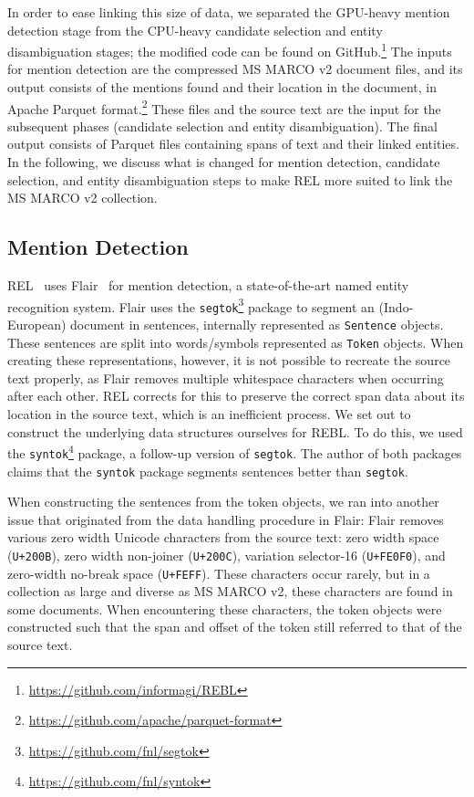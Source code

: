 In order to ease linking this size of data, we separated the GPU-heavy mention detection stage from the CPU-heavy candidate selection and entity disambiguation stages; the modified code can be found on GitHub.\footnote{\url{https://github.com/informagi/REBL}}
The inputs for mention detection are the compressed MS MARCO v2 document files, and its output consists of the mentions found and their location in the document, in Apache Parquet format.\footnote{\url{https://github.com/apache/parquet-format}}
These files and the source text are the input for the subsequent phases (candidate selection and entity disambiguation). The final output consists of Parquet files containing spans of text and their linked entities. 
In the following, we discuss what is changed for mention detection, candidate selection, and entity disambiguation steps to make REL more suited to link the MS MARCO v2 collection.  

\subsection{Mention Detection}
REL~\cite{REL} uses Flair~\cite{flair} for mention detection, a state-of-the-art named entity recognition system. Flair uses the \texttt{segtok}\footnote{\url{https://github.com/fnl/segtok}} package to segment an (Indo-European) document in sentences, internally represented as \texttt{Sentence} objects. These sentences are split into words/symbols represented as \texttt{Token} objects. When creating these representations, however, it is not possible to recreate the source text properly, as Flair removes multiple whitespace characters when occurring after each other. REL corrects for this to preserve the correct span data about its location in the source text, which is an inefficient process.
We set out to construct the underlying data structures ourselves for REBL. To do this, we used the \texttt{syntok}\footnote{\url{https://github.com/fnl/syntok}} package, a follow-up version of \texttt{segtok}. The author of both packages claims that the \texttt{syntok} package segments sentences better than \texttt{segtok}. 

When constructing the sentences from the token objects, we ran into another issue that originated from the data handling procedure in Flair: Flair removes various zero width Unicode characters from the source text: zero width space (\texttt{U+200B}), zero width non-joiner (\texttt{U+200C}), variation selector-16 (\texttt{U+FE0F0}), and zero-width no-break space (\texttt{U+FEFF}). These characters occur rarely, but in a collection as large and diverse as MS MARCO v2, these characters are found in some documents. When encountering these characters, the token objects were constructed such that the span and offset of the token still referred to that of the source text.

